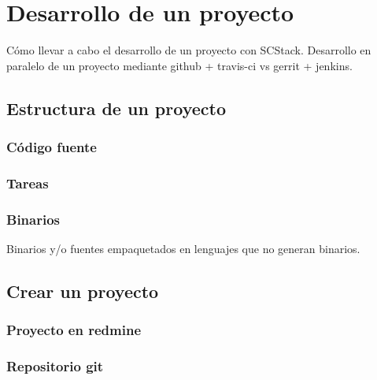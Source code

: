 \chapter{Desarrollo de un proyecto}
\label{chap:desarrollo}

\par Cómo llevar a cabo el desarrollo de un proyecto con SCStack. Desarrollo en paralelo de un proyecto mediante github + travis-ci vs gerrit + jenkins.

\section{Estructura de un proyecto}
\label{sec:estructura}


\subsection{Código fuente}
\label{sub:codigo-fuente}


\subsection{Tareas}
\label{sub:tareas}


\subsection{Binarios}
\label{sub:binarios}

Binarios y/o fuentes empaquetados en lenguajes que no generan binarios.


\section{Crear un proyecto}
\label{sec:crear-pryecto}

\subsection{Proyecto en redmine}
\label{sub:proyeto-redmine}


\subsection{Repositorio git}
\label{sub:repo-git}

